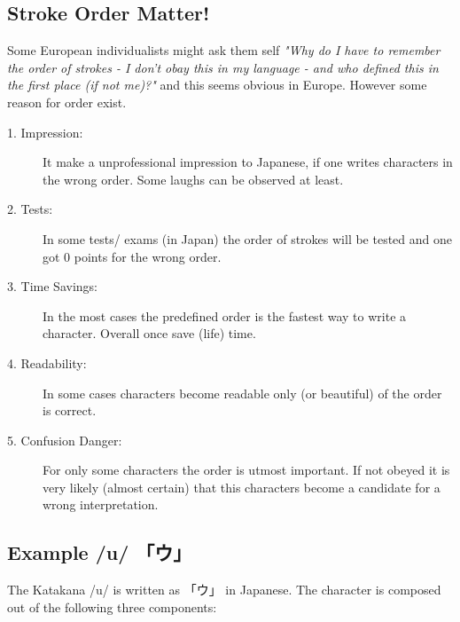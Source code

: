 \subsection{Stroke Order Matter!}\label{sec:StrokeOrderMatter}

Some European individualists might ask them self \textit{"Why do I have to
remember the order of strokes - I don't obay this in my language - and who
defined this in the first place (if not me)?"} and this seems obvious in
Europe. However some reason for order exist. 

\begin{description}

\item[1. Impression:] It make a unprofessional impression to Japanese, if one
writes characters in the wrong order. Some laughs can be observed at least.

\item[2. Tests:]  In some tests/ exams (in Japan) the order of strokes will be
tested and one got 0 points for the wrong order. 

\item[3. Time Savings:] In the most cases the predefined order is the fastest
way to write a character. Overall once save (life) time.

\item[4. Readability:] In some cases characters become readable only (or
beautiful) of the order is correct.

\item[5. Confusion Danger:] For only some characters the order is utmost
important. If not obeyed it is very likely (almost certain) that this
characters become a candidate for a wrong interpretation. 

\end{description}
\normalsize

\newpage
\subsection{Example /u/ {「ウ」}}

The Katakana /u/ is written as {「ウ」} in Japanese. The character is composed
out of the following three components:

\bigskip 
{}
\bigskip 
{}
\bigskip 
{} 

